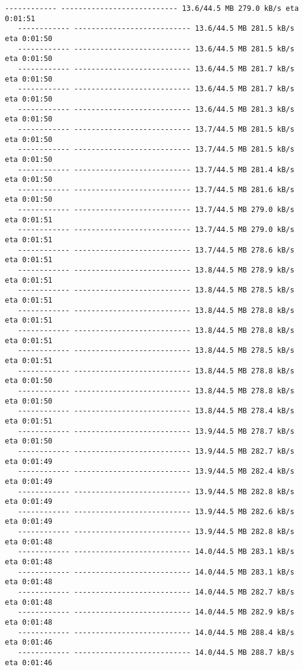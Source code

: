 \documentclass[11pt]{article}
\begin{document}
\begin{Verbatim}[commandchars=\\\{\}]
   ------------ --------------------------- 13.6/44.5 MB 279.0 kB/s eta 0:01:51
   ------------ --------------------------- 13.6/44.5 MB 281.5 kB/s eta 0:01:50
   ------------ --------------------------- 13.6/44.5 MB 281.5 kB/s eta 0:01:50
   ------------ --------------------------- 13.6/44.5 MB 281.7 kB/s eta 0:01:50
   ------------ --------------------------- 13.6/44.5 MB 281.7 kB/s eta 0:01:50
   ------------ --------------------------- 13.6/44.5 MB 281.3 kB/s eta 0:01:50
   ------------ --------------------------- 13.7/44.5 MB 281.5 kB/s eta 0:01:50
   ------------ --------------------------- 13.7/44.5 MB 281.5 kB/s eta 0:01:50
   ------------ --------------------------- 13.7/44.5 MB 281.4 kB/s eta 0:01:50
   ------------ --------------------------- 13.7/44.5 MB 281.6 kB/s eta 0:01:50
   ------------ --------------------------- 13.7/44.5 MB 279.0 kB/s eta 0:01:51
   ------------ --------------------------- 13.7/44.5 MB 279.0 kB/s eta 0:01:51
   ------------ --------------------------- 13.7/44.5 MB 278.6 kB/s eta 0:01:51
   ------------ --------------------------- 13.8/44.5 MB 278.9 kB/s eta 0:01:51
   ------------ --------------------------- 13.8/44.5 MB 278.5 kB/s eta 0:01:51
   ------------ --------------------------- 13.8/44.5 MB 278.8 kB/s eta 0:01:51
   ------------ --------------------------- 13.8/44.5 MB 278.8 kB/s eta 0:01:51
   ------------ --------------------------- 13.8/44.5 MB 278.5 kB/s eta 0:01:51
   ------------ --------------------------- 13.8/44.5 MB 278.8 kB/s eta 0:01:50
   ------------ --------------------------- 13.8/44.5 MB 278.8 kB/s eta 0:01:50
   ------------ --------------------------- 13.8/44.5 MB 278.4 kB/s eta 0:01:51
   ------------ --------------------------- 13.9/44.5 MB 278.7 kB/s eta 0:01:50
   ------------ --------------------------- 13.9/44.5 MB 282.7 kB/s eta 0:01:49
   ------------ --------------------------- 13.9/44.5 MB 282.4 kB/s eta 0:01:49
   ------------ --------------------------- 13.9/44.5 MB 282.8 kB/s eta 0:01:49
   ------------ --------------------------- 13.9/44.5 MB 282.6 kB/s eta 0:01:49
   ------------ --------------------------- 13.9/44.5 MB 282.8 kB/s eta 0:01:48
   ------------ --------------------------- 14.0/44.5 MB 283.1 kB/s eta 0:01:48
   ------------ --------------------------- 14.0/44.5 MB 283.1 kB/s eta 0:01:48
   ------------ --------------------------- 14.0/44.5 MB 282.7 kB/s eta 0:01:48
   ------------ --------------------------- 14.0/44.5 MB 282.9 kB/s eta 0:01:48
   ------------ --------------------------- 14.0/44.5 MB 288.4 kB/s eta 0:01:46
   ------------ --------------------------- 14.0/44.5 MB 288.7 kB/s eta 0:01:46

\end{Verbatim}
\end{document}
